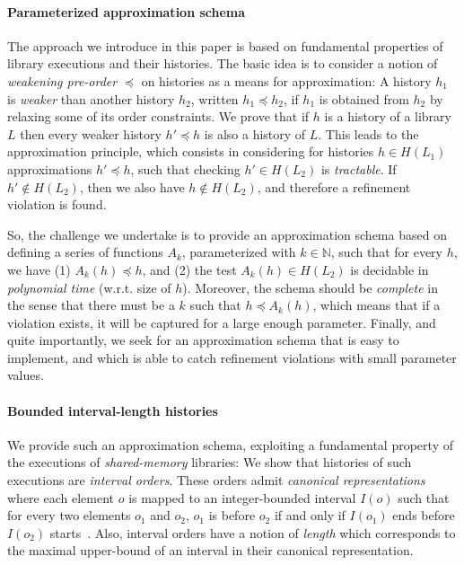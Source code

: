 \paragraph{Parameterized approximation schema}

The approach we introduce in this paper is based on fundamental properties of
library executions and their histories. The basic idea is to consider a notion
of \emph{weakening pre-order} $\preceq$ on histories as a means for
approximation: A history $h_1$ is \emph{weaker} than another history $h_2$,
written $h_1 \preceq h_2$, if $h_1$ is obtained from $h_2$ by relaxing some of
its order constraints. We prove that if $h$ is a history of a library $L$ then
every weaker history $h'\preceq h$ is also a history of $L$. This leads to the
approximation principle, which consists in considering for histories $h\in
H(L_1)$ approximations $h' \preceq h$, such that checking $h' \in H(L_2)$ is
\emph{tractable}. If $h' \not\in H(L_2)$, then we also have $h \not\in H(L_2)$,
and therefore a refinement violation is found.

So, the challenge we undertake is to provide an approximation schema based on
defining a series of functions $A_k$, parameterized with $k \in \mathbb{N}$,
such that for every $h$, we have (1) $A_k (h) \preceq h$, and (2) the test
$A_k(h) \in H(L_2)$ is decidable in \emph{polynomial time} (w.r.t. size of
$h$). Moreover, the schema should be \emph{complete} in the sense that there
must be a $k$ such that $h \preceq A_k(h)$, which means that if a violation
exists, it will be captured for a large enough parameter. Finally, and quite
importantly, we seek for an approximation schema that is easy to implement, and
which is able to catch refinement violations with small parameter values.

\paragraph{Bounded interval-length histories}

We provide such an approximation schema, exploiting a fundamental property of
the executions of \emph{shared-memory} libraries: We show that histories of
such executions are \emph{interval orders}. These orders admit \emph{canonical
representations} where each element $o$ is mapped to an integer-bounded
interval $I(o)$ such that for every two elements $o_1$ and $o_2$, $o_1$ is
before $o_2$ if and only if $I(o_1)$ ends before $I(o_2)$
starts~\cite{phd/Greenough76}. Also, interval orders have a notion of
\emph{length} which corresponds to the maximal upper-bound of an interval in
their canonical representation.

